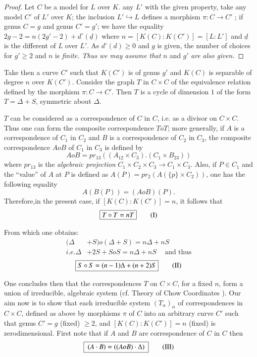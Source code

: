 \begin{proof}%
  Let $C$ be a model for $L$ over $K$. any $L'$ with the given
  property, take any model $C'$ of $L'$ over $K$; the inclusion
  $L'\hookrightarrow L$ defines a morphism $\pi : C \rightarrow C'$ ;
  if genus $C= g$ and genus $C' = g'$; we have the equality $ 2g-2 = n
  (2g' - 2) + d^{\circ}(\underline{d})$ where $n=[K(C) : K(C')] = [L :
    L']$ and $\underline{d}$ is the different of $L$ over $L'$. As
  $d^\circ(d)\ge 0$ and $g$ is given, the number of choices for $g'\ge
  2$ and $n$ is \textit{finite. Thus we may assume that}  $n$ and $g'$
  \textit{are also given.} 
\end{proof}
			
Take then a curve $C'$ such that $K(C')$  is of genus $g'$ and $K(C)$
is separable of degree $n$ over $K(C')$. Consider the graph $T$ in $C
\times C $ of the equivalence relation defined by the morphism $\pi :
C \rightarrow C'$. Then $T$ is a cycle of dimension $1$ of the form
$T= \Delta + S$, symmetric about $\Delta$. 
			
$T$ can be considered as a correspondence of $C$ in $C$, i.e. as a
divisor on $C \times C$. Thus one can form the composite
correspondence $ToT$; more generally, if $A$ is a correspondence of
$C_1$ in $C_2$ and $B$ is a correspondence of $C_2$ in $C_3$, the
composite correspondence $AoB$ of $C_1$ in $C_3$ is defined by  
$$
AoB = pr_{13} ((A_{12} \times C_3).(C_1 \times B_{23}))
$$
where $pr_{13}$ is the \textit{algebraic projection} ${ C_1 \times C_2
  \times C_3 \rightarrow C_1 \times C_3}$. Also, if $P \in C_1 $  and
the ``value'' of $A$ at $P$ is defined as $A(P) = pr_2(A(\{ p\} \times
C_2 ))$, one has the following equality 
$$
A(B (P)) = (AoB)(P).
$$
Therefore,\pageoriginale in the present case, if $[K(C): K(C')]=n$, it follows that
\begin{equation*}
\fbox{$T \circ T = n T$} \tag{I}\label{c2:I}
\end{equation*}

From which one obtains:
\begin{align*}
  (\Delta &+ S) o (\Delta + S)= n\Delta + nS\\ 
  i.e.  \Delta & + 2S + S o S = n\Delta + nS ~~~~\text{ and thus} 
\end{align*}
\begin{equation*}
  \fbox{$S \circ S = (n-1) \Delta + (n+2)S$} \tag{II}\label{c2:II} 
\end{equation*}

One concludes then that the correspondences $T$ on $C \times C$, for a
fixed $n$, form a union of irreducible, algebraic system (cf. Theory
of Chow Coordinates ). Our aim now is to show that each irreducible
system $(T_\alpha)_\alpha$ of correspondences in $C \times  C$,
defined as above by morphisms $ \pi $ of $C$ into an arbitrary curve
$C'$ such that genus $C' = g $ (fixed) $\ge  2$, and $[K(C):K(C')]=n
$ (fixed) is zerodimensional. First note that if $A$ and $B$ are
correspondence of $C$ in $C$ then 
\begin{equation*}
  \fbox{ $ (A\cdot B) = ((A o B) \cdot \Delta)$ }\tag{III}\label{c2:III} 
\end{equation*}

